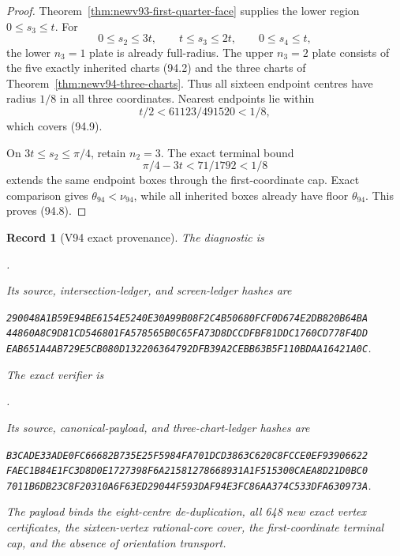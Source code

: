 \documentclass[11pt,oneside]{article}
\newtheorem{record}[theorem]{Record}
\theoremstyle{definition}
\theoremstyle{remark}
\begin{document}
\begin{proof}
Theorem~\ref{thm:newv93-first-quarter-face} supplies the lower
region \(0\leq s_3\leq t\).  For
\[
 0\leq s_2\leq3t,\qquad t\leq s_3\leq2t,\qquad
 0\leq s_4\leq t,                                    \tag{94.9}
\]
the lower \(n_3=1\) plate is already full-radius.  The upper
\(n_3=2\) plate consists of the five exactly inherited charts
(94.2) and the three charts of
Theorem~\ref{thm:newv94-three-charts}.  Thus all sixteen endpoint
centres have radius \(1/8\) in all three coordinates.  Nearest
endpoints lie within
\[
 t/2<61123/491520<1/8,                              \tag{94.10}
\]
which covers (94.9).

On \(3t\leq s_2\leq\pi/4\), retain \(n_2=3\).  The exact terminal
bound
\[
 \pi/4-3t<71/1792<1/8                               \tag{94.11}
\]
extends the same endpoint boxes through the first-coordinate cap.
Exact comparison gives \(\theta_{94}<\nu_{94}\), while all
inherited boxes already have floor \(\theta_{94}\).  This proves
(94.8).
\end{proof}

\begin{record}[V94 exact provenance]
\label{rec:newv94-provenance}
The diagnostic is
\begin{center}\footnotesize
{}.
\end{center}
Its source, intersection-ledger, and screen-ledger hashes are
\begin{center}\scriptsize
\texttt{290048A1B59E94BE6154E5240E30A99B08F2C4B50680FCF0D674E2DB820B64BA}\\
\texttt{44860A8C9D81CD546801FA578565B0C65FA73D8DCCDFBF81DDC1760CD778F4DD}\\
\texttt{EAB651A4AB729E5CB080D132206364792DFB39A2CEBB63B5F110BDAA16421A0C}.
\end{center}
The exact verifier is
\begin{center}\footnotesize
{}.
\end{center}
Its source, canonical-payload, and three-chart-ledger hashes are
\begin{center}\scriptsize
\texttt{B3CADE33ADE0FC66682B735E25F5984FA701DCD3863C620C8FCCE0EF93906622}\\
\texttt{FAEC1B84E1FC3D8D0E1727398F6A21581278668931A1F515300CAEA8D21D0BC0}\\
\texttt{7011B6DB23C8F20310A6F63ED29044F593DAF94E3FC86AA374C533DFA630973A}.
\end{center}
The payload binds the eight-centre de-duplication, all 648 new exact
vertex certificates, the sixteen-vertex rational-core cover, the
first-coordinate terminal cap, and the absence of orientation
transport.
\end{record}
\end{document}
